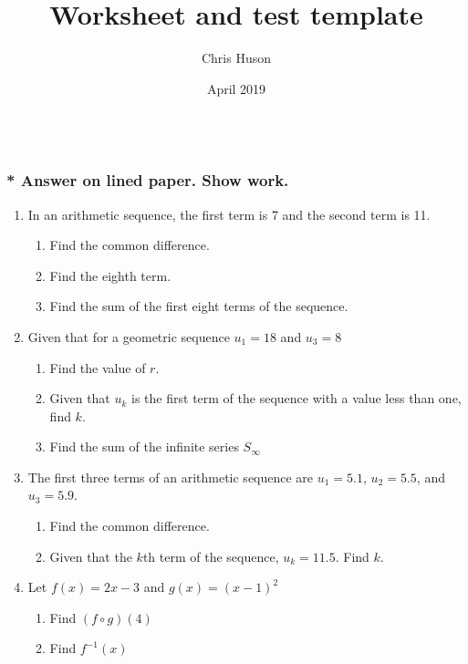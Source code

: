 \documentclass[12pt, oneside]{article}
\title{Worksheet and test template}
\author{Chris Huson}
\date{April 2019}
\begin{document}
\subsubsection*{\\* Answer on lined paper. Show work.}

\begin{enumerate}

\vspace{0.5 cm}


\item In an arithmetic sequence, the first term is 7 and the second term is 11.
\begin{enumerate}
    \item Find the common difference.
    \item Find the eighth term.
    \item Find the sum of the first eight terms of the sequence.
\end{enumerate}

\item Given that for a geometric sequence $u_1=18$ and $u_3=8$
\begin{enumerate}
    \item Find the value of $r$.
    \item Given that $u_k$ is the first term of the sequence with a value less than one, find $k$.
    \item Find the sum of the infinite series $S_\infty$
\end{enumerate}

\item The first three terms of an arithmetic sequence are $u_1=5.1$, $u_2=5.5$, and $u_3=5.9$.
\begin{enumerate}
    \item Find the common difference.
    \item Given that the $k$th term of the sequence, $u_k=11.5$. Find $k$.
\end{enumerate}


\item Let $f(x) = 2x -3$ and $g(x)=(x-1)^2$
\begin{enumerate}
    \item Find $(f \circ g)(4)$
    \item Find $f^{-1}(x)$
\end{enumerate}



\end{enumerate}
\end{document}

